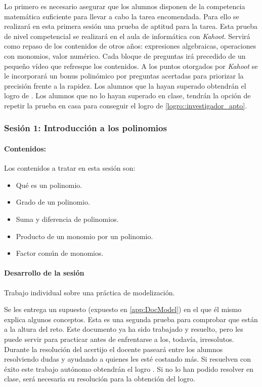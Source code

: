 Lo primero es necesario asegurar que los alumnos disponen de la competencia matemática suficiente para llevar a cabo la tarea encomendada.
%
Para ello se realizará en esta primera sesión una prueba de aptitud para la tarea.
%
Esta prueba de nivel competencial se realizará en el aula de informática con \textit{Kahoot}.
%
Servirá como repaso de los contenidos de otros años: expresiones algebraicas, operaciones con monomios, valor numérico.
%
Cada bloque de preguntas irá precedido de un pequeño vídeo que refresque los contenidos.
%
A los puntos otorgados por \textit{Kahoot} se le incorporará un bonus polinómico por preguntas acertadas para priorizar la precisión frente a la rapidez.
%
Los alumnos que la hayan superado obtendrán el logro de .
%
Los alumnos que no lo hayan superado en clase, tendrán la opción de repetir la prueba en casa para conseguir el logro de \ref{logro::investigador_apto}.



\subsubsection{Sesión 1: Introducción a los polinomios}

\paragraph{Contenidos:}
Los contenidos a tratar en esta sesión son:
\begin{itemize}
\item Qué es un polinomio.
\item Grado de un polinomio.
\item Suma y diferencia de polinomios.
\item Producto de un monomio por un polinomio.
\item Factor común de monomios.
\end{itemize}


\paragraph{Desarrollo de la sesión} Trabajo individual sobre una práctica de modelización.


Se les entrega un supuesto  (expuesto en \ref{app:DocModel}) en el que él mismo explica algunos conceptos.
%
Esta es una segunda prueba para comprobar que están a la altura del reto.
%
Este documento ya ha sido trabajado y resuelto, pero les puede servir para practicar antes de enfrentarse a los, todavía, irresolutos.
%
Durante la resolución del acertijo el docente paseará entre los alumnos resolviendo dudas y ayudando a quienes les esté costando más. 
%
Si resuelven con éxito este trabajo autónomo obtendrán el logro .
%
Si no lo han podido resolver en clase, será necesaria su resolución para la obtención del logro.

